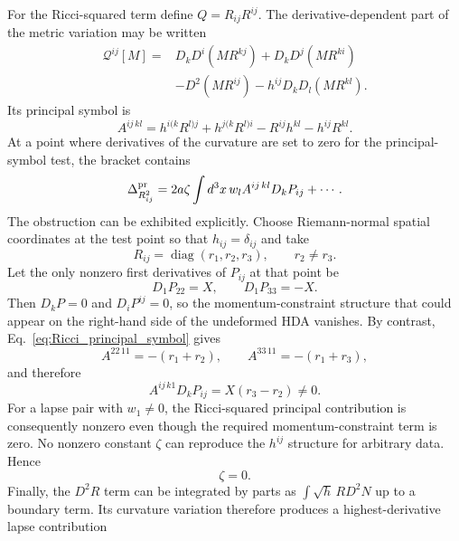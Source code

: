 \documentclass[11pt]{article}
\begin{document}
For the Ricci-squared term define $Q=R_{ij}R^{ij}$. The derivative-dependent part of the metric variation may be written
\begin{equation}
\begin{aligned}
\mathcal Q^{ij}[M]
={}&D_kD^i(MR^{kj})+D_kD^j(MR^{ki})\\
&-D^2(MR^{ij})-h^{ij}D_kD_l(MR^{kl}).
\end{aligned}
\label{eq:Q_variation}
\end{equation}
Its principal symbol is
\begin{equation}
\boxed{
A^{ij\,kl}
=h^{i(k}R^{l)j}+h^{j(k}R^{l)i}
-R^{ij}h^{kl}-h^{ij}R^{kl}.}
\label{eq:Ricci_principal_symbol}
\end{equation}
At a point where derivatives of the curvature are set to zero for the principal-symbol test, the bracket contains
\begin{equation}
    \Delta_{R_{ij}^2}^{\rm pr}
    =2a\zeta\int d^3x\,
    w_l A^{ij\,kl}D_kP_{ij}+\cdots .
    \label{eq:Ricci2_anomaly}
\end{equation}
The obstruction can be exhibited explicitly. Choose Riemann-normal spatial coordinates at the test point so that $h_{ij}=\delta_{ij}$ and take
\begin{equation}
    R_{ij}=\operatorname{diag}(r_1,r_2,r_3),
    \qquad r_2\neq r_3.
\end{equation}
Let the only nonzero first derivatives of $P_{ij}$ at that point be
\begin{equation}
    D_1P_{22}=X,
    \qquad
    D_1P_{33}=-X.
\end{equation}
Then $D_kP=0$ and $D_iP^{ij}=0$, so the momentum-constraint structure that could appear on the right-hand side of the undeformed HDA vanishes. By contrast, Eq.~\eqref{eq:Ricci_principal_symbol} gives
\begin{equation}
    A^{22\,11}=-(r_1+r_2),
    \qquad
    A^{33\,11}=-(r_1+r_3),
\end{equation}
and therefore
\begin{equation}
    A^{ij\,k1}D_kP_{ij}=X(r_3-r_2)\neq0.
\end{equation}
For a lapse pair with $w_1\neq0$, the Ricci-squared principal contribution is consequently nonzero even though the required momentum-constraint term is zero. No nonzero constant $\zeta$ can reproduce the $h^{ij}$ structure for arbitrary data. Hence
\begin{equation}
    \boxed{\zeta=0.}
    \label{eq:zeta_zero}
\end{equation}
Finally, the $D^2R$ term can be integrated by parts as $\int\sqrt h\,R D^2N$ up to a boundary term. Its curvature variation therefore produces a highest-derivative lapse contribution
\end{document}
